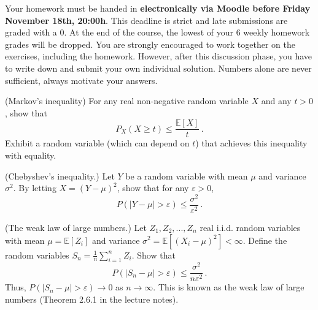 \documentclass[a4paper,10pt,landscape,twocolumn]{scrartcl}
\newcommand\deadline{Friday November 18th, 20:00h}
\begin{document}
\homeworkproblems

{\sffamily\noindent
Your homework must be handed in \textbf{electronically via Moodle before \deadline}. This deadline is strict and late submissions are graded with a 0. At the end of the course, the lowest of your 6 weekly homework grades will be dropped. You are strongly encouraged to work together on the exercises, including the homework. However, after this discussion phase, you have to write down and submit your own individual solution. Numbers alone are never sufficient, always motivate your answers.
}

\begin{exercise}
	\begin{subex}[(3pt)] (Markov's inequality) For any real non-negative random variable $X$ and any $t > 0$, show that
	\[
	P_X(X \geq t) \leq \frac{\mathbb{E}[X]}{t}\, .
	\]
	Exhibit a random variable (which can depend on $t$) that achieves this inequality with equality.
	\end{subex}
	\begin{subex}[(2pt)] (Chebyshev's inequality.) Let $Y$ be a random variable with mean $\mu$ and variance $\sigma^2$. By letting $X = (Y - \mu)^2$, show that for any $\varepsilon > 0$,
	\[
	P(|Y - \mu| > \varepsilon) \leq \frac{\sigma^2}{\varepsilon^2} \, .
	\]
	\end{subex}
	\begin{subex}[(2pt)] (The weak law of large numbers.) Let $Z_1, Z_2, ..., Z_n$ real i.i.d. random variables with mean $\mu = \mathbb{E}[Z_i]$ and variance $\sigma^2 = \mathbb{E}[(X_i - \mu)^2] < \infty$. Define the random variables $S_n = \frac{1}{n} \sum_{i=1}^n Z_i$. Show that
	\[
	P(|S_n - \mu | > \varepsilon) \leq \frac{\sigma^2}{n\varepsilon^2}\, .
	\]
	Thus, $P(|S_n - \mu| > \varepsilon) \to 0$ as $n \to \infty$. This is known as the weak law of large numbers (Theorem 2.6.1 in the lecture notes).
	\end{subex}
\end{exercise}
\end{document}
